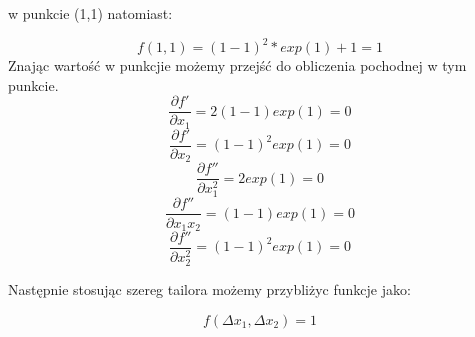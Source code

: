 \documentclass[paper=a4, fontsize=11pt]{scrartcl} %
\begin{document}
w punkcie (1,1) natomiast:

\[f(1,1) = (1 - 1)^2*exp(1)+1 = 1\]
Znając wartość w punkcjie możemy przejść do obliczenia pochodnej w tym punkcie.
\[\frac{\partial f'}{\partial x_1} = 2(1-1)exp(1)=0\]
\[\frac{\partial f'}{\partial x_2} = (1-1)^2exp(1)=0\]
\[\frac{\partial f''}{\partial x_1^2} = 2exp(1)=0\]
\[\frac{\partial f''}{\partial x_1x_2} = (1-1)exp(1)=0\]
\[\frac{\partial f''}{\partial x_2^2} = (1-1)^2exp(1)=0\]

Następnie stosując szereg tailora możemy przybliżyc funkcje jako:

\[f(\Delta x_1,\Delta x_2)=1\]

\end{document}
